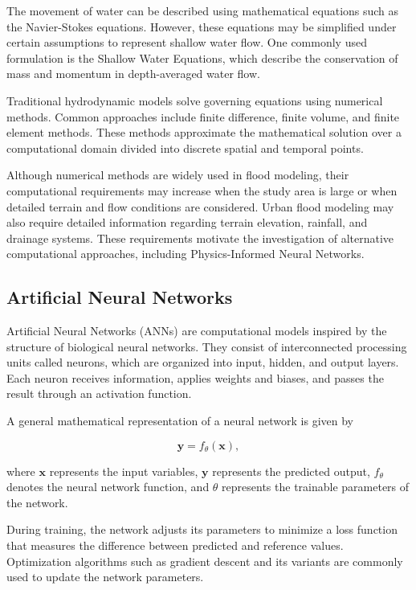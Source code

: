 The movement of water can be described using mathematical equations such as the Navier-Stokes equations. However, these equations may be simplified under certain assumptions to represent shallow water flow. One commonly used formulation is the Shallow Water Equations, which describe the conservation of mass and momentum in depth-averaged water flow.

Traditional hydrodynamic models solve governing equations using numerical methods. Common approaches include finite difference, finite volume, and finite element methods. These methods approximate the mathematical solution over a computational domain divided into discrete spatial and temporal points.

Although numerical methods are widely used in flood modeling, their computational requirements may increase when the study area is large or when detailed terrain and flow conditions are considered. Urban flood modeling may also require detailed information regarding terrain elevation, rainfall, and drainage systems. These requirements motivate the investigation of alternative computational approaches, including Physics-Informed Neural Networks.

\subsection{Artificial Neural Networks}


Artificial Neural Networks (ANNs) are computational models inspired by the structure of biological neural networks. They consist of interconnected processing units called neurons, which are organized into input, hidden, and output layers. Each neuron receives information, applies weights and biases, and passes the result through an activation function.

A general mathematical representation of a neural network is given by

\[
\mathbf{y}=f_{\theta}(\mathbf{x}),
\]

where $\mathbf{x}$ represents the input variables, $\mathbf{y}$ represents the predicted output, $f_{\theta}$ denotes the neural network function, and $\theta$ represents the trainable parameters of the network.

During training, the network adjusts its parameters to minimize a loss function that measures the difference between predicted and reference values. Optimization algorithms such as gradient descent and its variants are commonly used to update the network parameters.

